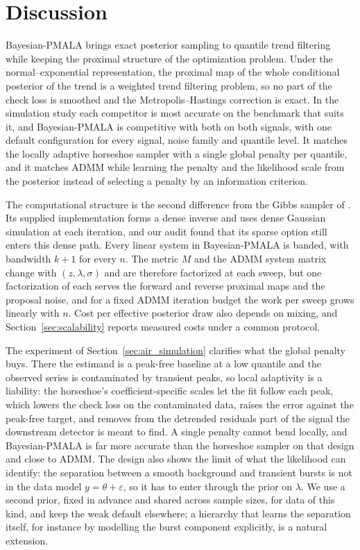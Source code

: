 
\section{Discussion}
\label{sec:discussion}

Bayesian-PMALA brings exact posterior sampling to quantile trend filtering while keeping the proximal structure of the optimization problem. Under the normal--exponential representation, the proximal map of the whole conditional posterior of the trend is a weighted trend filtering problem, so no part of the check loss is smoothed and the Metropolis--Hastings correction is exact. In the simulation study each competitor is most accurate on the benchmark that suits it, and Bayesian-PMALA is competitive with both on both signals, with one default configuration for every signal, noise family and quantile level. It matches the locally adaptive horseshoe sampler with a single global penalty per quantile, and it matches ADMM while learning the penalty and the likelihood scale from the posterior instead of selecting a penalty by an information criterion.

The computational structure is the second difference from the Gibbs sampler of \citet{onizuka2024fast}. Its supplied implementation forms a dense inverse and uses dense Gaussian simulation at each iteration, and our audit found that its sparse option still enters this dense path. Every linear system in Bayesian-PMALA is banded, with bandwidth $k+1$ for every $n$. The metric $M$ and the ADMM system matrix change with $(z, \lambda, \sigma)$ and are therefore factorized at each sweep, but one factorization of each serves the forward and reverse proximal maps and the proposal noise, and for a fixed ADMM iteration budget the work per sweep grows linearly with $n$. Cost per effective posterior draw also depends on mixing, and Section~\ref{sec:scalability} reports measured costs under a common protocol.

The experiment of Section~\ref{sec:air_simulation} clarifies what the global penalty buys. There the estimand is a peak-free baseline at a low quantile and the observed series is contaminated by transient peaks, so local adaptivity is a liability: the horseshoe's coefficient-specific scales let the fit follow each peak, which lowers the check loss on the contaminated data, raises the error against the peak-free target, and removes from the detrended residuals part of the signal the downstream detector is meant to find. A single penalty cannot bend locally, and Bayesian-PMALA is far more accurate than the horseshoe sampler on that design and close to ADMM. The design also shows the limit of what the likelihood can identify: the separation between a smooth background and transient bursts is not in the data model $y = \theta + \varepsilon$, so it has to enter through the prior on $\lambda$. We use a second prior, fixed in advance and shared across sample sizes, for data of this kind, and keep the weak default elsewhere; a hierarchy that learns the separation itself, for instance by modelling the burst component explicitly, is a natural extension.


